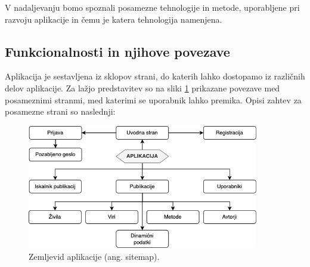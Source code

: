 \documentclass[a4paper, 12pt]{book}
\begin{document}
V nadaljevanju bomo spoznali posamezne tehnologije in metode, uporabljene pri razvoju aplikacije in čemu je katera tehnologija namenjena. 

\subsection{Funkcionalnosti in njihove povezave}
Aplikacija je sestavljena iz sklopov strani, do katerih lahko dostopamo iz različnih delov aplikacije. Za lažjo predstavitev so na sliki \ref{sitemap} prikazane povezave med posameznimi stranmi, med katerimi se uporabnik lahko premika. Opisi zahtev za posamezne strani so naslednji:


\begin{figure}[h]
\begin{center}
\includegraphics[width=0.9\textwidth]{slike/page-map.png}
\end{center}
\caption{ Zemljevid aplikacije (ang. sitemap). }
\label{sitemap}
\end{figure}
\end{document}

